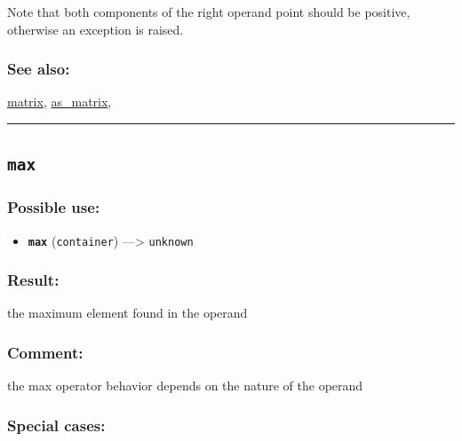 \documentclass[]{book}
\providecommand{\tightlist}{%
  \setlength{\itemsep}{0pt}\setlength{\parskip}{0pt}}
\theoremstyle{definition}
\theoremstyle{definition}
\theoremstyle{definition}
\theoremstyle{remark}
\begin{document}
Note that both components of the right operand point should be positive,
otherwise an exception is raised.

\subsubsection{See also:}\label{see-also-133}

\href{operators-i-to-m.html\#matrix}{matrix},
\href{operators-a-to-a.html\#as_matrix}{as\_matrix},

\begin{center}\rule{0.5\linewidth}{\linethickness}\end{center}

\subsection{\texorpdfstring{\texttt{max}}{max}}\label{max}

\subsubsection{Possible use:}\label{possible-use-339}

\begin{itemize}
\tightlist
\item
  \textbf{\texttt{max}} (\texttt{container}) ---\textgreater{}
  \texttt{unknown}
\end{itemize}

\subsubsection{Result:}\label{result-328}

the maximum element found in the operand

\subsubsection{Comment:}\label{comment-65}

the max operator behavior depends on the nature of the operand

\subsubsection{Special cases:}\label{special-cases-93}
\end{document}
